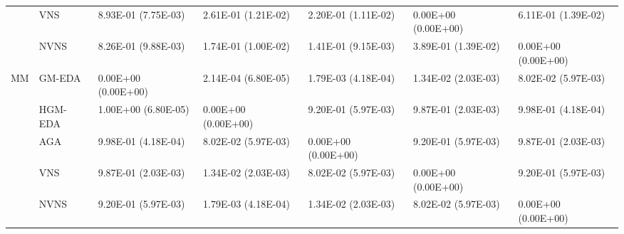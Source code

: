 \begin{tabular}{lllllll}
   & VNS &  8.93E-01 (7.75E-03) &  2.61E-01 (1.21E-02) &  2.20E-01 (1.11E-02) &  0.00E+00 (0.00E+00) &  6.11E-01 (1.39E-02) \\
   & NVNS &  8.26E-01 (9.88E-03) &  1.74E-01 (1.00E-02) &  1.41E-01 (9.15E-03) &  3.89E-01 (1.39E-02) &  0.00E+00 (0.00E+00) \\
MM & GM-EDA &  0.00E+00 (0.00E+00) &  2.14E-04 (6.80E-05) &  1.79E-03 (4.18E-04) &  1.34E-02 (2.03E-03) &  8.02E-02 (5.97E-03) \\
   & HGM-EDA &  1.00E+00 (6.80E-05) &  0.00E+00 (0.00E+00) &  9.20E-01 (5.97E-03) &  9.87E-01 (2.03E-03) &  9.98E-01 (4.18E-04) \\
   & AGA &  9.98E-01 (4.18E-04) &  8.02E-02 (5.97E-03) &  0.00E+00 (0.00E+00) &  9.20E-01 (5.97E-03) &  9.87E-01 (2.03E-03) \\
   & VNS &  9.87E-01 (2.03E-03) &  1.34E-02 (2.03E-03) &  8.02E-02 (5.97E-03) &  0.00E+00 (0.00E+00) &  9.20E-01 (5.97E-03) \\
   & NVNS &  9.20E-01 (5.97E-03) &  1.79E-03 (4.18E-04) &  1.34E-02 (2.03E-03) &  8.02E-02 (5.97E-03) &  0.00E+00 (0.00E+00) \\
\bottomrule
\end{tabular}
